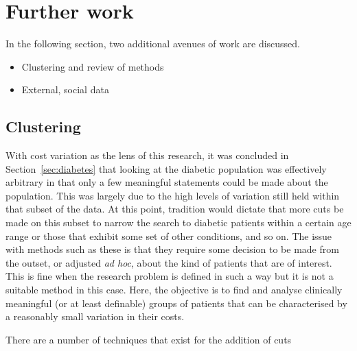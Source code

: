 \section{Further work}

In the following section, two additional avenues of work are discussed. 

\begin{itemize}
    \item Clustering and review of methods
    \item External, social data
\end{itemize}

\subsection{Clustering}

With cost variation as the lens of this research, it was concluded in
Section~\ref{sec:diabetes} that looking at the diabetic population was
effectively arbitrary in that only a few meaningful statements could be made
about the population. This was largely due to the high levels of variation still
held within that subset of the data. At this point, tradition would dictate that
more cuts be made on this subset to narrow the search to diabetic patients
within a certain age range or those that exhibit some set of other conditions,
and so on. The issue with methods such as these is that they require some
decision to be made from the outset, or adjusted \textit{ad hoc}, about the kind
of patients that are of interest. This is fine when the research problem is
defined in such a way but it is not a suitable method in this case. Here, the
objective is to find and analyse clinically meaningful (or at least definable)
groups of patients that can be characterised by a reasonably small variation in
their costs.

There are a number of techniques that exist for the addition of cuts 
